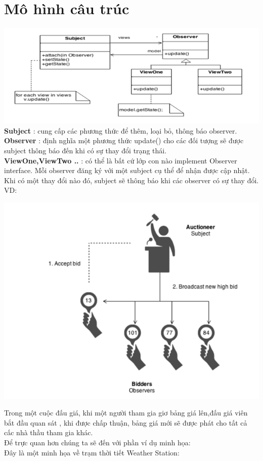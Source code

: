 \section{Mô hình câu trúc}
\includegraphics{GALLEYS/images/chapter2/diagram1}\\
\textbf{Subject} : cung cấp các phương thức để thêm, loại bỏ, thông báo observer.\\
\textbf{Observer} : định nghĩa một phương thức update() cho các đối tượng sẽ được subject thông báo đến khi có sự thay đổi trạng thái. \\
\textbf{ViewOne,ViewTwo ..} : có thể là bất cứ lớp con nào implement Observer interface. Mỗi observer đăng ký với một subject cụ thể để nhận được cập nhật.\\
Khi có một thay đổi nào đó, subject sẽ thông báo khi các observer có sự thay đổi. VD:
\begin{center}
	\includegraphics{GALLEYS/images/chapter2/exdiagram}\\
\end{center}
\hspace{0.5cm}Trong một cuộc đấu giá, khi một người tham gia giơ bảng giá lên,đấu giá viên bắt đầu quan sát , khi được chấp thuận, bảng giá mới sẽ được phát cho tất cả cấc nhà thầu tham gia khác.\\
   Để trực quan hơn chúng ta sẽ đến với phần ví dụ minh họa:\\
   Đây là một minh họa về trạm thời tiết Weather Station:\\

